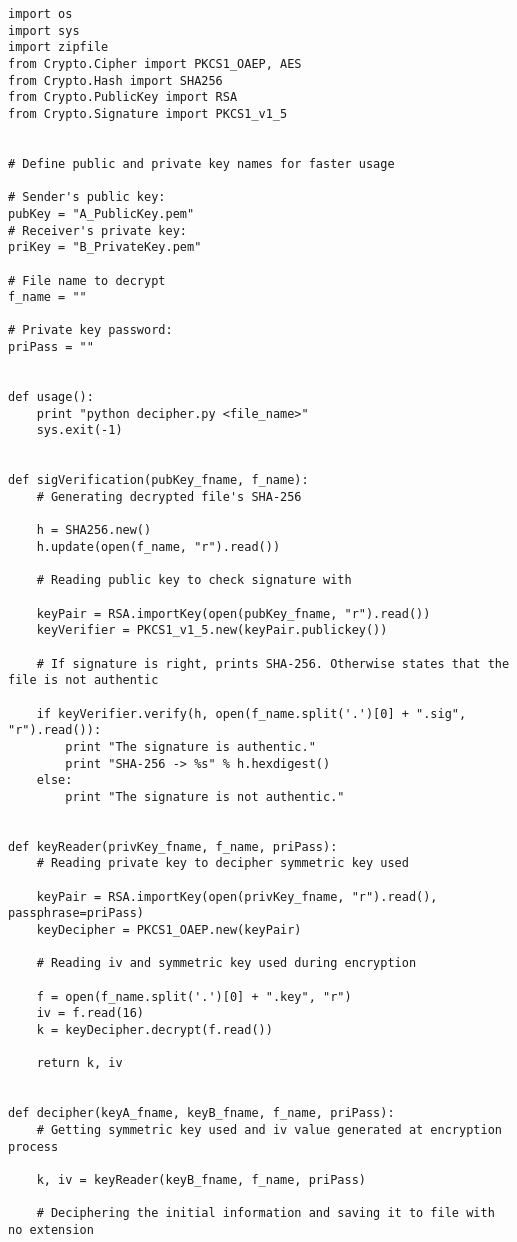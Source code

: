 \documentclass[a4paper,11pt,openright,oneside]{report}
\begin{document}
\begin{verbatim}
import os
import sys
import zipfile
from Crypto.Cipher import PKCS1_OAEP, AES
from Crypto.Hash import SHA256
from Crypto.PublicKey import RSA
from Crypto.Signature import PKCS1_v1_5


# Define public and private key names for faster usage

# Sender's public key:
pubKey = "A_PublicKey.pem"
# Receiver's private key:
priKey = "B_PrivateKey.pem"

# File name to decrypt
f_name = ""

# Private key password:
priPass = ""


def usage():
    print "python decipher.py <file_name>"
    sys.exit(-1)


def sigVerification(pubKey_fname, f_name):
    # Generating decrypted file's SHA-256

    h = SHA256.new()
    h.update(open(f_name, "r").read())

    # Reading public key to check signature with

    keyPair = RSA.importKey(open(pubKey_fname, "r").read())
    keyVerifier = PKCS1_v1_5.new(keyPair.publickey())

    # If signature is right, prints SHA-256. Otherwise states that the file is not authentic

    if keyVerifier.verify(h, open(f_name.split('.')[0] + ".sig", "r").read()):
        print "The signature is authentic."
        print "SHA-256 -> %s" % h.hexdigest()
    else:
        print "The signature is not authentic."


def keyReader(privKey_fname, f_name, priPass):
    # Reading private key to decipher symmetric key used

    keyPair = RSA.importKey(open(privKey_fname, "r").read(), passphrase=priPass)
    keyDecipher = PKCS1_OAEP.new(keyPair)

    # Reading iv and symmetric key used during encryption

    f = open(f_name.split('.')[0] + ".key", "r")
    iv = f.read(16)
    k = keyDecipher.decrypt(f.read())

    return k, iv


def decipher(keyA_fname, keyB_fname, f_name, priPass):
    # Getting symmetric key used and iv value generated at encryption process

    k, iv = keyReader(keyB_fname, f_name, priPass)

    # Deciphering the initial information and saving it to file with no extension


\end{verbatim}
\end{document}
